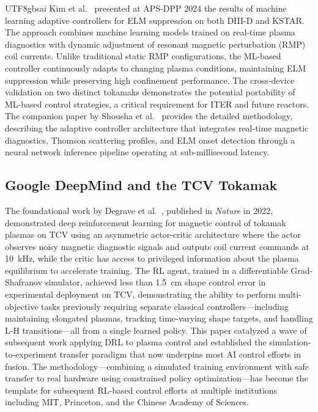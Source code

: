 \documentclass[12pt,a4paper]{article}
\begin{document}
\begin{CJK}{UTF8}{gbsai}
Kim et al.~\citep{Kim2024APSDPP} presented at APS-DPP 2024 the results of machine learning adaptive controllers for ELM suppression on both DIII-D and KSTAR. The approach combines machine learning models trained on real-time plasma diagnostics with dynamic adjustment of resonant magnetic perturbation (RMP) coil currents. Unlike traditional static RMP configurations, the ML-based controller continuously adapts to changing plasma conditions, maintaining ELM suppression while preserving high confinement performance. The cross-device validation on two distinct tokamaks demonstrates the potential portability of ML-based control strategies, a critical requirement for ITER and future reactors. The companion paper by Shousha et al.~\citep{Shousha2024} provides the detailed methodology, describing the adaptive controller architecture that integrates real-time magnetic diagnostics, Thomson scattering profiles, and ELM onset detection through a neural network inference pipeline operating at sub-millisecond latency.

\subsection{Google DeepMind and the TCV Tokamak}

The foundational work by Degrave et al.~\citep{Degrave2022Nature}, published in \textit{Nature} in 2022, demonstrated deep reinforcement learning for magnetic control of tokamak plasmas on TCV using an asymmetric actor-critic architecture where the actor observes noisy magnetic diagnostic signals and outputs coil current commands at 10~kHz, while the critic has access to privileged information about the plasma equilibrium to accelerate training. The RL agent, trained in a differentiable Grad-Shafranov simulator, achieved less than 1.5~cm shape control error in experimental deployment on TCV, demonstrating the ability to perform multi-objective tasks previously requiring separate classical controllers---including maintaining elongated plasmas, tracking time-varying shape targets, and handling L-H transitions---all from a single learned policy. This paper catalyzed a wave of subsequent work applying DRL to plasma control and established the simulation-to-experiment transfer paradigm that now underpins most AI control efforts in fusion. The methodology---combining a simulated training environment with safe transfer to real hardware using constrained policy optimization---has become the template for subsequent RL-based control efforts at multiple institutions including MIT, Princeton, and the Chinese Academy of Sciences.


\end{CJK}
\end{document}
